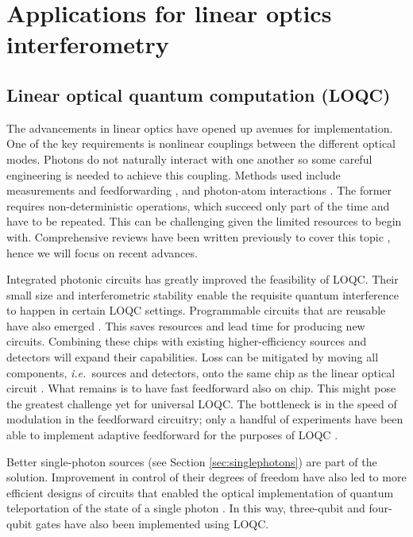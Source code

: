 \documentclass[times,final]{elsarticle}
\begin{document}
\section{Applications for linear optics interferometry}

\subsection{Linear optical quantum computation (LOQC)}\label{sec:LOQC}
The advancements in linear optics have opened up avenues for implementation. One of the key requirements is nonlinear couplings between the different optical modes. Photons do not naturally interact with one another so some careful engineering is needed to achieve this coupling. Methods used include measurements and feedforwarding \cite{bib:KLM01}, and photon-atom interactions \cite{bib:Brod16}. The former requires non-deterministic operations, which succeed only part of the time and have to be repeated. This can be challenging given the limited resources to begin with. Comprehensive reviews have been written previously to cover this topic \cite{bib:JW12,bib:Kok05}, hence we will focus on recent advances.


 Integrated photonic circuits has greatly improved the feasibility of LOQC. Their small size and interferometric stability enable the requisite quantum interference to happen in certain LOQC settings. Programmable circuits that are reusable have also emerged \cite{bib:Metcalf14,bib:Carolan15}. This saves resources and lead time for producing new circuits. Combining these chips with existing higher-efficiency sources and detectors will expand their capabilities. Loss can be mitigated by moving all components, {\it i.e.~}sources and detectors, onto the same chip as the linear optical circuit \cite{bib:Sprengers11, bib:Silverstone14}.  What remains is to have fast feedforward also on chip. This might pose the greatest challenge yet for universal LOQC. The bottleneck is in the speed of modulation in the feedforward circuitry; only a handful of experiments have been able to implement adaptive feedforward for the purposes of LOQC \cite{bib:Prevedel07,bib:Xiao-Song12,bib:Mikova12,bib:Zhao14}. 
 
Better single-photon sources (see Section \ref{sec:singlephotons}) are part of the solution. Improvement in control of their degrees of freedom have also led to more efficient designs of circuits \cite{bib:Zhou11,bib:Lanyon09} that enabled the optical implementation of quantum teleportation of the state of a single photon \cite{bib:Wang15}. In this way, three-qubit \cite{bib:Lanyon09,bib:Micuda13,bib:Patel16} and four-qubit \cite{bib:Starek16} gates have also been implemented using LOQC.
 
\end{document}
